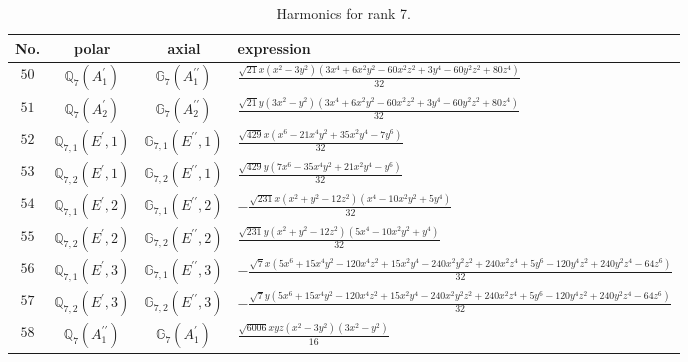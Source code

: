 \documentclass[fleqn,8pt,landscape]{jsarticle}
\begin{document}
\begin{table}[ht!]
\begin{center}
\caption{Harmonics for rank 7.}
\renewcommand{\arraystretch}{1.3}
\begin{tabular}{cccl} \hline \hline
No. & polar & axial & expression \\ \hline
$ 50 $ & $ \mathbb{Q}_{7}(A_{1}^{\prime}) $ & $ \mathbb{G}_{7}(A_{1}^{\prime\prime}) $ & $ \frac{\sqrt{21} x \left(x^{2} - 3 y^{2}\right) \left(3 x^{4} + 6 x^{2} y^{2} - 60 x^{2} z^{2} + 3 y^{4} - 60 y^{2} z^{2} + 80 z^{4}\right)}{32} $ \\
$ 51 $ & $ \mathbb{Q}_{7}(A_{2}^{\prime}) $ & $ \mathbb{G}_{7}(A_{2}^{\prime\prime}) $ & $ \frac{\sqrt{21} y \left(3 x^{2} - y^{2}\right) \left(3 x^{4} + 6 x^{2} y^{2} - 60 x^{2} z^{2} + 3 y^{4} - 60 y^{2} z^{2} + 80 z^{4}\right)}{32} $ \\
$ 52 $ & $ \mathbb{Q}_{7,1}(E^{\prime},1) $ & $ \mathbb{G}_{7,1}(E^{\prime\prime},1) $ & $ \frac{\sqrt{429} x \left(x^{6} - 21 x^{4} y^{2} + 35 x^{2} y^{4} - 7 y^{6}\right)}{32} $ \\
$ 53 $ & $ \mathbb{Q}_{7,2}(E^{\prime},1) $ & $ \mathbb{G}_{7,2}(E^{\prime\prime},1) $ & $ \frac{\sqrt{429} y \left(7 x^{6} - 35 x^{4} y^{2} + 21 x^{2} y^{4} - y^{6}\right)}{32} $ \\
$ 54 $ & $ \mathbb{Q}_{7,1}(E^{\prime},2) $ & $ \mathbb{G}_{7,1}(E^{\prime\prime},2) $ & $ - \frac{\sqrt{231} x \left(x^{2} + y^{2} - 12 z^{2}\right) \left(x^{4} - 10 x^{2} y^{2} + 5 y^{4}\right)}{32} $ \\
$ 55 $ & $ \mathbb{Q}_{7,2}(E^{\prime},2) $ & $ \mathbb{G}_{7,2}(E^{\prime\prime},2) $ & $ \frac{\sqrt{231} y \left(x^{2} + y^{2} - 12 z^{2}\right) \left(5 x^{4} - 10 x^{2} y^{2} + y^{4}\right)}{32} $ \\
$ 56 $ & $ \mathbb{Q}_{7,1}(E^{\prime},3) $ & $ \mathbb{G}_{7,1}(E^{\prime\prime},3) $ & $ - \frac{\sqrt{7} x \left(5 x^{6} + 15 x^{4} y^{2} - 120 x^{4} z^{2} + 15 x^{2} y^{4} - 240 x^{2} y^{2} z^{2} + 240 x^{2} z^{4} + 5 y^{6} - 120 y^{4} z^{2} + 240 y^{2} z^{4} - 64 z^{6}\right)}{32} $ \\
$ 57 $ & $ \mathbb{Q}_{7,2}(E^{\prime},3) $ & $ \mathbb{G}_{7,2}(E^{\prime\prime},3) $ & $ - \frac{\sqrt{7} y \left(5 x^{6} + 15 x^{4} y^{2} - 120 x^{4} z^{2} + 15 x^{2} y^{4} - 240 x^{2} y^{2} z^{2} + 240 x^{2} z^{4} + 5 y^{6} - 120 y^{4} z^{2} + 240 y^{2} z^{4} - 64 z^{6}\right)}{32} $ \\
$ 58 $ & $ \mathbb{Q}_{7}(A_{1}^{\prime\prime}) $ & $ \mathbb{G}_{7}(A_{1}^{\prime}) $ & $ \frac{\sqrt{6006} x y z \left(x^{2} - 3 y^{2}\right) \left(3 x^{2} - y^{2}\right)}{16} $ \\

\end{tabular}
\end{center}
\end{table}
\end{document}
